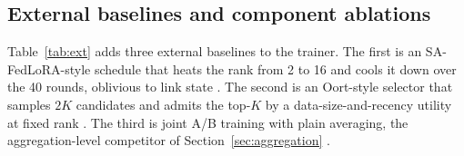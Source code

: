 \documentclass[preprint,12pt]{elsarticle}
\begin{document}
\subsection{External baselines and component ablations}
Table~\ref{tab:ext} adds three external baselines to the trainer. The first is an SA-FedLoRA-style schedule that heats the rank from 2 to 16 and cools it down over the 40 rounds, oblivious to link state \cite{yang2024safedlora}. The second is an Oort-style selector that samples $2K$ candidates and admits the top-$K$ by a data-size-and-recency utility at fixed rank \cite{oort2021oort}. The third is joint A/B training with plain averaging, the aggregation-level competitor of Section~\ref{sec:aggregation} \cite{guo2025fedsalora}.

\begin{table}[H]
\centering
\caption{External baselines, real trainer (non-IID CIFAR-10, five seeds). Accuracy at round 40; timely ratio, bytes, and delivered mean rank averaged over rounds 30--39.}
\label{tab:ext}
\end{table}
\end{document}
